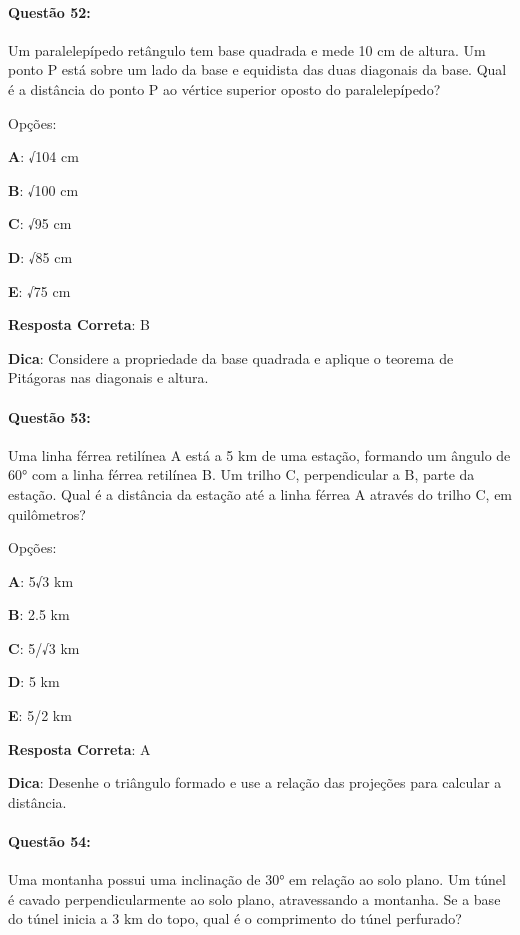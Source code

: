 \documentclass{article}
\begin{document}
\paragraph{Questão 52:}
{Um paralelepípedo retângulo tem base quadrada e mede 10 cm de altura. Um ponto P está sobre um lado da base e equidista das duas diagonais da base. Qual é a distância do ponto P ao vértice superior oposto do paralelepípedo?}

\vspace{\baselineskip}Opções:

\vspace{\baselineskip}\textbf{A}: √104 cm 

\textbf{B}: √100 cm 

\textbf{C}: √95 cm 

\textbf{D}: √85 cm 

\textbf{E}: √75 cm 

\vspace{\baselineskip}\textbf{Resposta Correta}: B

\vspace{\baselineskip}\textbf{Dica}: Considere a propriedade da base quadrada e aplique o teorema de Pitágoras nas diagonais e altura.

\paragraph{Questão 53:}
{Uma linha férrea retilínea A está a 5 km de uma estação, formando um ângulo de 60° com a linha férrea retilínea B. Um trilho C, perpendicular a B, parte da estação. Qual é a distância da estação até a linha férrea A através do trilho C, em quilômetros?}

\vspace{\baselineskip}Opções:

\vspace{\baselineskip}\textbf{A}: 5√3 km 

\textbf{B}: 2.5 km 

\textbf{C}: 5/√3 km 

\textbf{D}: 5 km 

\textbf{E}: 5/2 km 

\vspace{\baselineskip}\textbf{Resposta Correta}: A

\vspace{\baselineskip}\textbf{Dica}: Desenhe o triângulo formado e use a relação das projeções para calcular a distância.

\paragraph{Questão 54:}
{Uma montanha possui uma inclinação de 30° em relação ao solo plano. Um túnel é cavado perpendicularmente ao solo plano, atravessando a montanha. Se a base do túnel inicia a 3 km do topo, qual é o comprimento do túnel perfurado?}
\end{document}
